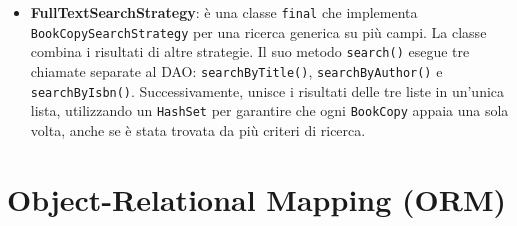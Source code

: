 \documentclass[
  italian,
  paper=a4,
  ,captions=tableheading
]{scrbook}
\newcommand{\passthrough}[1]{#1}
\begin{document}
\begin{itemize}
\begin{itemize}
\begin{lstlisting}[language=Java, language=Java, caption={Esempio di implementazione del metodo search() per la ricerca per ISBN.}, label={lst:isbnstrategy}, label=lst:isbnstrategy]
  @Override
  public List<BookCopy> search(String query, BookCopiesDAO bookCopiesDAO) {
    if (query == null || query.trim().isEmpty()){
        System.err.println("Error: the query is null or empty");
        return List.of();
    }
    // Regex added to remove all characters apart from the numbers and the X for ISBN10
    String cleanQuery = query.trim().replaceAll("[^0-9X]", "");
    try{
        return bookCopiesDAO.searchByIsbn(cleanQuery);
    } catch (Exception e) { // broad exception check
        throw new RuntimeException("Error searching book copies by isbn", e);
    }
  }
\end{lstlisting}
  \item
    \textbf{FullTextSearchStrategy}: è una classe
    \passthrough{\lstinline!final!} che implementa
    \passthrough{\lstinline!BookCopySearchStrategy!} per una ricerca
    generica su più campi. La classe combina i risultati di altre
    strategie. Il suo metodo \passthrough{\lstinline!search()!} esegue
    tre chiamate separate al DAO:
    \passthrough{\lstinline!searchByTitle()!},
    \passthrough{\lstinline!searchByAuthor()!} e
    \passthrough{\lstinline!searchByIsbn()!}. Successivamente, unisce i
    risultati delle tre liste in un'unica lista, utilizzando un
    \passthrough{\lstinline!HashSet!} per garantire che ogni
    \passthrough{\lstinline!BookCopy!} appaia una sola volta, anche se è
    stata trovata da più criteri di ricerca.
  \end{itemize}
\end{itemize}

\section{Object-Relational Mapping
(ORM)}\label{object-relational-mapping-orm}
\end{document}
